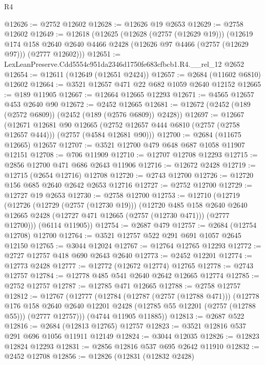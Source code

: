 \begin{lexlean}{R4}
\begin{coremodule}
@12626 := @2752 @12602
@12628 := @12626 @19 @2653
@12629 := @2758 @12602
@12649 := @12618
    (@12625
      (@12628 (@2757 (@12629 @19)))
      (@12619
        @174
        @158
        @2640
        @2640
        @4466
        @2428
        (@12626 @97 @4466 (@2757 (@12629 @97)))
        (@2777 @12602)))
@12651 := LexLeanPreserve.Cdd5554c951da2346d1750fe683cfbcb1.R4.__rel_12 @2652
@12654 := @12611 (@12649 (@12651 @2424))
@12657 := @2684 (@11602 @6810) @12602
@12664 := @3521 @12657 @471 @22 @682 @1059 @2640 @12152
@12665 := @189 @11905
@12667 := @12664 @12665 @12293
@12671 := @4565 @12657 @453 @2640 @90
@12672 := @2452 @12665
@12681 := @12672 (@2452 (@189 (@2572 @6809)) (@2452 (@189 (@2576 @6809)) @2428))
@12697 := @12667
    (@12671
      @12681
      @90
      @12665
      (@2752 @12657 @444 @6810 (@2757 (@2758 @12657 @444)))
      (@2757 (@4584 @12681 @90)))
@12700 := @2684 (@11675 @12665) @12657
@12707 := @3521 @12700 @479 @648 @687 @1058 @11907 @12151
@12708 := @706 @11909
@12710 := @12707 @12708 @12293
@12715 := @2856 @12700 @471 @686 @2643 @11906
@12716 := @12672 @2428
@12719 := @12715 (@2654 @12716) @12708
@12720 := @2743 @12700
@12726 := @12720 @156 @685 @2640 @2642 @2653 @12716
@12727 := @2752 @12700
@12729 := @12727 @19 @2653
@12730 := @2758 @12700
@12753 := @12710
    (@12719
      (@12726
        (@12729 (@2757 (@12730 @19)))
        (@12720
          @485
          @158
          @2640
          @2640
          @12665
          @2428
          (@12727 @471 @12665 (@2757 (@12730 @471)))
          (@2777 @12700)))
      (@6114 @11905))
@12754 := @2687 @479
@12757 := @2684 (@12754 @12708) @12700
@12764 := @3521 @12757 @522 @291 @691 @1057 @2645 @12150
@12765 := @3044 @12024
@12767 := @12764 @12765 @12293
@12772 := @2727 @12757 @418 @690 @2643 @2640
@12773 := @2452 @12201
@12774 := @12773 @2428
@12777 := @12772 (@12672 @12774) @12765
@12778 := @2743 @12757
@12784 := @12778 @485 @541 @2640 @2642 @12665 @12774
@12785 := @2752 @12757
@12787 := @12785 @471 @12665
@12788 := @2758 @12757
@12812 := @12767
    (@12777
      (@12784
        (@12787 (@2757 (@12788 @471)))
        (@12778
          @176
          @158
          @2640
          @2640
          @12201
          @2428
          (@12785 @55 @12201 (@2757 (@12788 @55)))
          (@2777 @12757)))
      (@4744 @11905 @11885))
@12813 := @2687 @522
@12816 := @2684 (@12813 @12765) @12757
@12823 := @3521 @12816 @537 @291 @696 @1056 @11911 @12149
@12824 := @3044 @12035
@12826 := @12823 @12824 @12293
@12831 := @2856 @12816 @537 @695 @2642 @11910
@12832 := @2452 @12708
@12856 := @12826
    (@12831
      (@12832 @2428)

\end{coremodule}
\end{lexlean}
